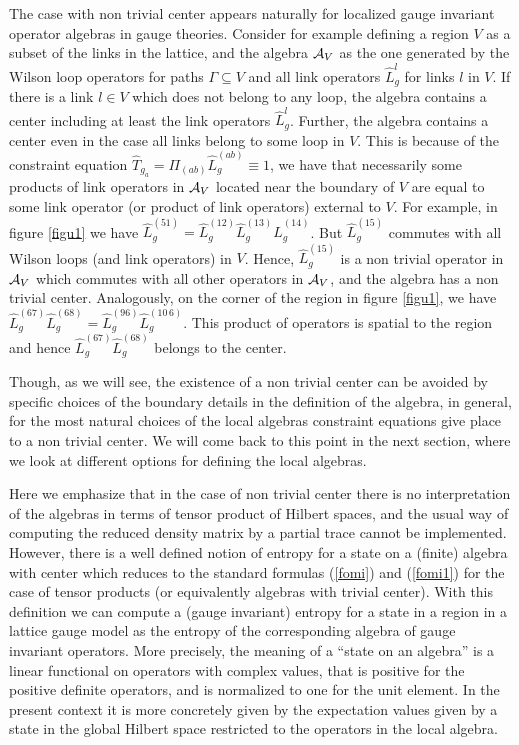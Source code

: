 \documentclass[12pt,a4paper]{article}
\begin{document}
The case with non trivial center appears naturally for localized gauge invariant operator algebras in gauge theories. 
Consider for example defining a region $V$ as a subset of the links in the lattice, and the algebra ${\cal A}_V$ as the one generated by the 
Wilson loop operators for paths $\Gamma\subseteq V$ and all link operators $\hat{L}_g^{l}$ for links $l$ in $V$. If there is a link $l\in V$ which does not belong to any loop, the 
algebra contains a center including at least the link operators $\hat{L}^l_g$. Further, the algebra contains a center even in the case all links belong 
to some loop in $V$. This is because of the constraint equation $\hat{T}_{g_a}=\Pi_{(ab)} \hat{L}_g^{(ab)}\equiv 1$, we have that necessarily some  
products of link operators in ${\cal A}_V$ located near the boundary of $V$ are equal to some link operator (or product of link operators) external to $V$. 
For example, in figure \ref{figu1} we have $\hat{L}^{(51)}_g= \hat{L}_g^{(12)} \hat{L}_g^{(13)} \hat{L}_g^{(14)}$. But $\hat{L}_g^{(15)}$ commutes 
with all Wilson loops (and link operators) in $V$. Hence, $\hat{L}_g^{(15)}$ is a non trivial operator in ${\cal A}_V$ which commutes with all other 
operators in ${\cal A}_V$, and the algebra has a non trivial center. Analogously, on the corner of the region in figure \ref{figu1}, we 
have $\hat{L}^{(67)}_g\hat{L}_g^{(68)}=\hat{L}^{(96)}_g\hat{L}_g^{(10\, 6)}$. This product of operators is spatial to the region and 
hence $\hat{L}^{(67)}_g\hat{L}_g^{(68)}$ belongs to the center. 
 
 Though, as we will see, the existence of a non trivial center can be avoided by specific choices of the boundary details in the definition of the algebra, in general, for the most natural choices  of the local algebras constraint 
equations give place to a non trivial center. We will come back to this point in the next section, 
where we look at different options for defining the local algebras. 
 
 Here we emphasize that in the case of non trivial center there is no interpretation of the algebras in terms of tensor product of Hilbert spaces, and 
the usual way of computing the reduced density matrix by a partial trace cannot be implemented. However, there is a well defined notion of entropy 
for a state on a (finite) algebra with center which reduces to the standard formulas (\ref{fomi}) and (\ref{fomi1}) for the case of tensor products 
(or equivalently algebras with trivial center). With this definition we can compute a (gauge invariant) entropy for a state in a region in a lattice 
gauge model as the entropy of the corresponding algebra of gauge invariant operators. More precisely, the meaning of a ``state on an algebra'' is  a 
linear functional on operators with complex values, that is positive for the positive definite operators, and is normalized to one for the unit element. 
In the present context it is more concretely given by the expectation values given by a state in the global Hilbert space restricted to the 
operators in the local algebra.   
\end{document}
